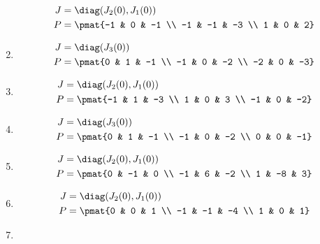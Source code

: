 \begin{enumerate}
\begin{align*}
J &= \diag(J_{2}(0), J_{1}(0))\\
P &= \pmat{-1 & 0 & -1 \\ -1 & -1 & -3 \\ 1 & 0 & 2}
\end{align*}

\item

\begin{align*}
J &= \diag(J_{3}(0))\\
P &= \pmat{0 & 1 & -1 \\ -1 & 0 & -2 \\ -2 & 0 & -3}
\end{align*}

\item

\begin{align*}
J &= \diag(J_{2}(0), J_{1}(0))\\
P &= \pmat{-1 & 1 & -3 \\ 1 & 0 & 3 \\ -1 & 0 & -2}
\end{align*}

\item

\begin{align*}
J &= \diag(J_{3}(0))\\
P &= \pmat{0 & 1 & -1 \\ -1 & 0 & -2 \\ 0 & 0 & -1}
\end{align*}

\item

\begin{align*}
J &= \diag(J_{2}(0), J_{1}(0))\\
P &= \pmat{0 & -1 & 0 \\ -1 & 6 & -2 \\ 1 & -8 & 3}
\end{align*}

\item

\begin{align*}
J &= \diag(J_{2}(0), J_{1}(0))\\
P &= \pmat{0 & 0 & 1 \\ -1 & -1 & -4 \\ 1 & 0 & 1}
\end{align*}

\item


\end{enumerate}
